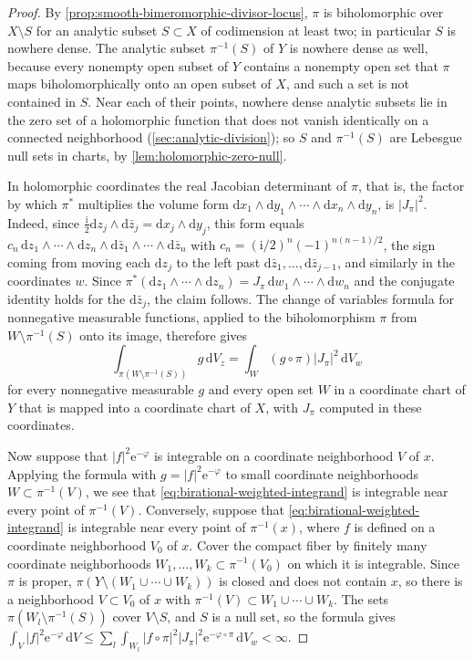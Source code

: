 \begin{proof}
By \cref{prop:smooth-bimeromorphic-divisor-locus}, $\pi$ is biholomorphic over $X\setminus S$ for an analytic subset $S\subset X$ of codimension at least two; in particular $S$ is nowhere dense. The analytic subset $\pi^{-1}(S)$ of $Y$ is nowhere dense as well, because every nonempty open subset of $Y$ contains a nonempty open set that $\pi$ maps biholomorphically onto an open subset of $X$, and such a set is not contained in $S$. Near each of their points, nowhere dense analytic subsets lie in the zero set of a holomorphic function that does not vanish identically on a connected neighborhood (\cref{sec:analytic-division}); so $S$ and $\pi^{-1}(S)$ are Lebesgue null sets in charts, by \cref{lem:holomorphic-zero-null}.

In holomorphic coordinates the real Jacobian determinant of $\pi$, that is, the factor by which $\pi^*$ multiplies the volume form $\mathrm dx_1\wedge\mathrm dy_1\wedge\cdots\wedge\mathrm dx_n\wedge\mathrm dy_n$, is $|J_\pi|^2$. Indeed, since $\frac{\mathrm i}2\mathrm dz_j\wedge\mathrm d\bar z_j=\mathrm dx_j\wedge\mathrm dy_j$, this form equals $c_n\,\mathrm dz_1\wedge\cdots\wedge\mathrm dz_n\wedge\mathrm d\bar z_1\wedge\cdots\wedge\mathrm d\bar z_n$ with $c_n=(\mathrm i/2)^n(-1)^{n(n-1)/2}$, the sign coming from moving each $\mathrm dz_j$ to the left past $\mathrm d\bar z_1,\ldots,\mathrm d\bar z_{j-1}$, and similarly in the coordinates $w$. Since $\pi^*(\mathrm dz_1\wedge\cdots\wedge\mathrm dz_n)=J_\pi\,\mathrm dw_1\wedge\cdots\wedge\mathrm dw_n$ and the conjugate identity holds for the $\mathrm d\bar z_j$, the claim follows. The change of variables formula for nonnegative measurable functions, applied to the biholomorphism $\pi$ from $W\setminus\pi^{-1}(S)$ onto its image, therefore gives
\[
 \int_{\pi(W\setminus\pi^{-1}(S))}g\,\mathrm dV_z
 =\int_W(g\circ\pi)|J_\pi|^2\,\mathrm dV_w
\]
for every nonnegative measurable $g$ and every open set $W$ in a coordinate chart of $Y$ that is mapped into a coordinate chart of $X$, with $J_\pi$ computed in these coordinates.

Now suppose that $|f|^2\mathrm e^{-\varphi}$ is integrable on a coordinate neighborhood $V$ of $x$. Applying the formula with $g=|f|^2\mathrm e^{-\varphi}$ to small coordinate neighborhoods $W\subset\pi^{-1}(V)$, we see that \eqref{eq:birational-weighted-integrand} is integrable near every point of $\pi^{-1}(V)$. Conversely, suppose that \eqref{eq:birational-weighted-integrand} is integrable near every point of $\pi^{-1}(x)$, where $f$ is defined on a coordinate neighborhood $V_0$ of $x$. Cover the compact fiber by finitely many coordinate neighborhoods $W_1,\ldots,W_k\subset\pi^{-1}(V_0)$ on which it is integrable. Since $\pi$ is proper, $\pi(Y\setminus(W_1\cup\cdots\cup W_k))$ is closed and does not contain $x$, so there is a neighborhood $V\subset V_0$ of $x$ with $\pi^{-1}(V)\subset W_1\cup\cdots\cup W_k$. The sets $\pi(W_l\setminus\pi^{-1}(S))$ cover $V\setminus S$, and $S$ is a null set, so the formula gives $\int_V|f|^2\mathrm e^{-\varphi}\,\mathrm dV\leq\sum_l\int_{W_l}|f\circ\pi|^2|J_\pi|^2\mathrm e^{-\varphi\circ\pi}\,\mathrm dV_w<\infty$.


\end{proof}
